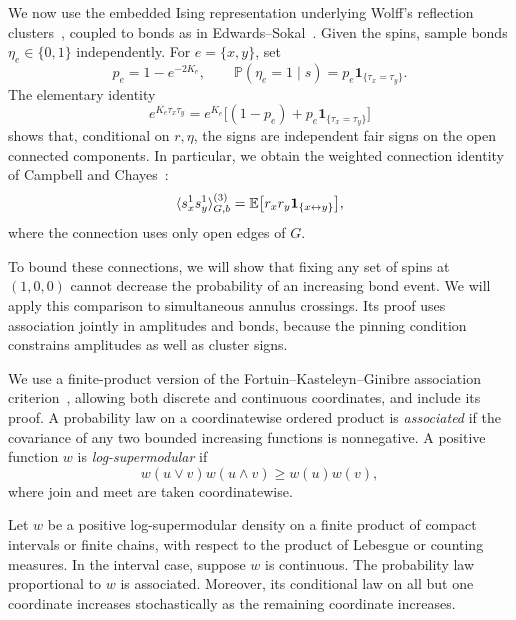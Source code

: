 We now use the embedded Ising representation underlying Wolff's
reflection clusters~\cite{Wolff}, coupled to bonds as in
Edwards--Sokal~\cite{EdwardsSokal}. Given the spins, sample bonds
$\eta_e\in\{0,1\}$ independently. For $e=\{x,y\}$, set
\begin{equation}\label{eq:bond-parameter}
 p_e=1-e^{-2K_e},
 \qquad
 \mathbb P(\eta_e=1\mid s)
   =p_e\mathbf1_{\{\tau_x=\tau_y\}}.
\end{equation}
The elementary identity
\begin{equation}\label{eq:ising-bond-expansion}
 e^{K_e\tau_x\tau_y}
  =e^{K_e}\big[(1-p_e)+p_e\mathbf1_{\{\tau_x=\tau_y\}}\big]
\end{equation}
shows that, conditional on $r,\eta$, the signs are independent fair
signs on the open connected components. In particular, we obtain the
weighted connection identity of Campbell and Chayes~\cite[Corollary~4,
Equation~(7)]{CC}:
\begin{equation}\label{eq:spin-connection}
 \langle s_x^1s_y^1\rangle_{G,b}^{(3)}
 =\mathbb E\big[r_xr_y\mathbf1_{\{x\leftrightarrow y\}}\big],
\end{equation}
where the connection uses only open edges of $G$.

To bound these connections, we will show that fixing any set of spins
at $(1,0,0)$ cannot decrease the probability of an increasing bond
event. We will apply this comparison to simultaneous annulus crossings.
Its proof uses association jointly in amplitudes and bonds, because
the pinning condition constrains amplitudes as well as cluster signs.

We use a finite-product version of the
Fortuin--Kasteleyn--Ginibre association criterion~\cite{FKG}, allowing
both discrete and continuous coordinates, and include its proof.
A probability law on a coordinatewise ordered product is
\emph{associated} if the covariance of any two bounded increasing
functions is nonnegative.  A positive function $w$ is
\emph{log-supermodular} if
\[
 w(u\vee v)w(u\wedge v)\geq w(u)w(v),
\]
where join and meet are taken coordinatewise.

\begin{lemma}\label{lem:association}
Let $w$ be a positive log-supermodular density on a finite product of
compact intervals or finite chains, with respect to the product of
Lebesgue or counting measures.  In the interval case, suppose $w$ is
continuous.  The probability law proportional to $w$ is associated.
Moreover, its conditional law on all but one coordinate increases
stochastically as the remaining coordinate increases.
\end{lemma}

